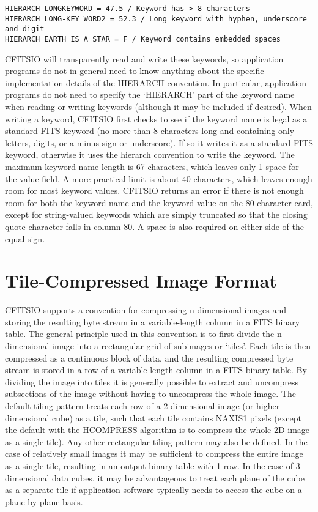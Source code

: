 \documentclass[11pt]{book}
\begin{document}
\begin{verbatim}
HIERARCH LONGKEYWORD = 47.5 / Keyword has > 8 characters
HIERARCH LONG-KEY_WORD2 = 52.3 / Long keyword with hyphen, underscore and digit
HIERARCH EARTH IS A STAR = F / Keyword contains embedded spaces
\end{verbatim}
CFITSIO will transparently read and write these keywords, so application
programs do not in general need to know anything about the specific
implementation details of the HIERARCH convention.  In particular,
application programs do not need to specify the `HIERARCH' part of the
keyword name when reading or writing keywords (although it
may be included if desired).  When writing a keyword, CFITSIO first
checks to see if the keyword name is legal as a standard FITS keyword
(no more than 8 characters long and containing only letters, digits, or
a minus sign or underscore). If so it writes it as a standard FITS
keyword, otherwise it uses the hierarch convention to write the
keyword.   The maximum keyword name length is 67 characters, which
leaves only 1 space for the value field.  A more practical limit is
about 40 characters, which leaves enough room for most keyword values.
CFITSIO returns an error if there is not enough room for both the
keyword name and the keyword value on the 80-character card, except for
string-valued keywords which are simply truncated so that the closing
quote character falls in column 80. A space is also required on either 
side of the equal sign.


\section{Tile-Compressed Image Format}

CFITSIO supports a convention for compressing n-dimensional images and
storing the resulting byte stream in a variable-length column in a FITS
binary table.  The general principle used in this convention is to
first divide the n-dimensional image into a rectangular grid of
subimages or `tiles'.  Each tile is then compressed as a continuous
block of data, and the resulting compressed byte stream is stored in a
row of a variable length column in a FITS binary table. By dividing the
image into tiles it is generally possible to extract and uncompress
subsections of the image without having to uncompress the whole image.
The default tiling pattern treats each row of a 2-dimensional image (or
higher dimensional cube) as a tile, such that each tile contains NAXIS1
pixels (except the default with the HCOMPRESS algorithm is to
compress the whole 2D image as a single tile). Any other rectangular
tiling pattern may also be defined. In
the case of relatively small images it may be sufficient to compress
the entire image as a single tile, resulting in an output binary table
with 1 row.  In the case of 3-dimensional data cubes, it may be
advantageous to treat each plane of the cube as a separate tile if
application software typically needs to access the cube on a plane by
plane basis.
\end{document}
